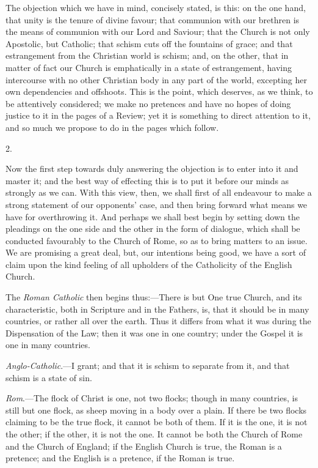 The objection which we have in mind, concisely
stated, is this: on the one hand, that unity is the tenure of divine
favour; that communion with our brethren is the means of communion
with our Lord and Saviour; that the Church is not only Apostolic, but
Catholic; that schism cuts off the fountains of grace; and that
estrangement from the Christian world is schism; and, on the other,
that in matter of fact our Church is emphatically in a state of
estrangement, having intercourse with no other Christian body in any
part of the world, excepting her own dependencies and offshoots. This
is the point, which deserves, as we think, to be attentively
considered; we make no pretences and have no hopes of doing justice to
it in the pages of a Review; yet it is something to direct attention
to it, and so much we propose to do in the pages which follow.

2.

Now the first step towards duly answering the
objection is to enter into it and master it; and the best way of
effecting this is to put it before our minds as strongly as we can.
With this view, then, we shall first of all endeavour to make a strong
statement of our opponents' case, and then bring forward what means we
have for overthrowing it. And perhaps we shall best begin by setting
down the pleadings on the one side and the other in the form of
dialogue, which shall be conducted favourably to the Church of Rome,
so as to bring matters to an issue. We are promising a great deal,
but, our intentions being good, we have a sort of claim upon the
kind feeling of all upholders of the Catholicity of the English
Church.

The \emph{Roman Catholic} then begins
thus:—There is but One true Church, and its characteristic, both in
Scripture and in the Fathers, is, that it should be in many countries,
or rather all over the earth. Thus it differs from what it was during
the Dispensation of the Law; then it was one in one country; under the
Gospel it is one in many countries.

\emph{Anglo-Catholic}.—I grant; and that it is
schism to separate from it, and that schism is a state of sin.

\emph{Rom}.—The flock of Christ is one, not two
flocks; though in many countries, is still but one flock, as sheep
moving in a body over a plain. If there be two flocks claiming to be
the true flock, it cannot be both of them. If it is the one, it is not
the other; if the other, it is not the one. It cannot be both the
Church of Rome and the Church of England; if the English Church is
true, the Roman is a pretence; and the English is a pretence, if the
Roman is true.

